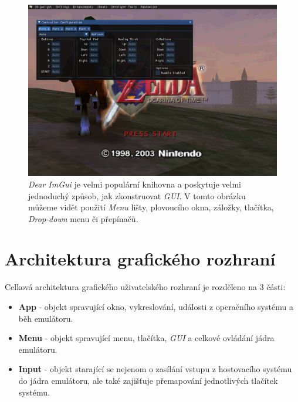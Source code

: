 \begin{figure}[h]
	\centering
	\includegraphics[width=1.0\textwidth]{obrazky-figures/soh.png}
	\caption[Příklad použití \textit{Dear ImGui}]{\textit{Dear ImGui} je velmi populární knihovna a poskytuje velmi jednoduchý způsob, jak zkonstruovat \textit{GUI}. V tomto obrázku
    můžeme vidět použití \textit{Menu} lišty, plovoucího okna, záložky, tlačítka, \textit{Drop-down} menu či přepínačů.}
	\label{imgui-showcase}
\end{figure}

\section{Architektura grafického rozhraní}

Celková architektura grafického uživatelského rozhraní je rozděleno na 3 části:\\[\baselineskip]
\begin{minipage}{\textwidth}
\begin{itemize}
    \item{\textbf{App} - objekt spravující okno, vykreslování, události z operačního systému a běh emulátoru.}
    \item{\textbf{Menu} - objekt spravující menu, tlačítka, \textit{GUI} a celkové ovládání jádra emulátoru.}
    \item{\textbf{Input} - objekt starající se nejenom o zasílání vstupu z hostovacího systému do jádra emulátoru, ale také zajišťuje přemapování jednotlivých tlačítek systému.}
\end{itemize}
\end{minipage}\\[\baselineskip]

